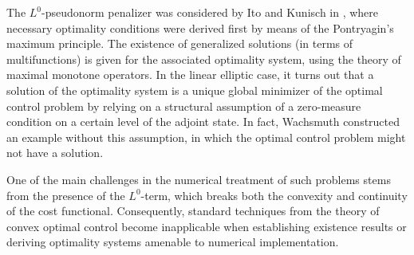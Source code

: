 \documentclass[11pt,a4paper]{amsart}
\begin{document}
The $L^0$-pseudonorm penalizer was considered by Ito and Kunisch in \cite{itokun2014}, where necessary optimality conditions were derived first by means of the Pontryagin's maximum principle. The existence of generalized solutions (in terms of multifunctions) is given for the associated optimality system, using the theory of maximal monotone operators. In the linear elliptic case, it turns out that a solution of the optimality system is a unique global minimizer of the optimal control problem by relying on a structural assumption of a zero-measure condition on a certain level of the adjoint state. In fact, Wachsmuth \cite{wachsmuth19} constructed an example without this assumption, in which the optimal control problem might not have a solution. 

 

{\color{red} One of the main challenges in the numerical treatment of such problems stems from the presence of the $L^0$-term, which breaks both the convexity and continuity of the cost functional. Consequently, standard techniques from the theory of convex optimal control become inapplicable when establishing existence results or deriving optimality systems amenable to numerical implementation.}





\end{document}
